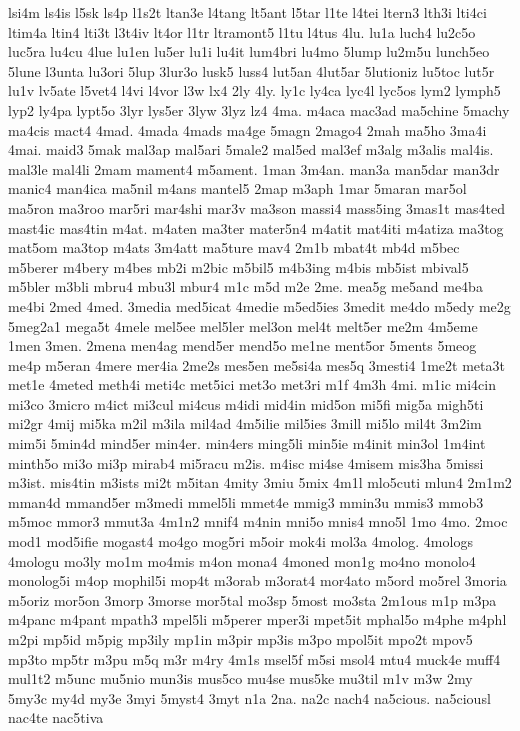 {lsi4m
ls4is
l5sk
ls4p
l1s2t
ltan3e
l4tang
lt5ant
l5tar
l1te
l4tei
ltern3
lth3i
lti4ci
ltim4a
ltin4
lti3t
l3t4iv
lt4or
l1tr
ltramont5
l1tu
l4tus
4lu.
lu1a
luch4
lu2c5o
luc5ra
lu4cu
4lue
lu1en
lu5er
lu1i
lu4it
lum4bri
lu4mo
5lump
lu2m5u
lunch5eo
5lune
l3unta
lu3ori
5lup
3lur3o
lusk5
luss4
lut5an
4lut5ar
5lutioniz
lu5toc
lut5r
lu1v
lv5ate
l5vet4
l4vi
l4vor
l3w
lx4
2ly
4ly.
ly1c
ly4ca
lyc4l
lyc5os
lym2
lymph5
lyp2
ly4pa
lypt5o
3lyr
lys5er
3lyw
3lyz
lz4
4ma.
m4aca
mac3ad
ma5chine
5machy
ma4cis
mact4
4mad.
4mada
4mads
ma4ge
5magn
2mago4
2mah
ma5ho
3ma4i
4mai.
maid3
5mak
mal3ap
mal5ari
5male2
mal5ed
mal3ef
m3alg
m3alis
mal4is.
mal3le
mal4li
2mam
mament4
m5ament.
1man
3m4an.
man3a
man5dar
man3dr
manic4
man4ica
ma5nil
m4ans
mantel5
2map
m3aph
1mar
5maran
mar5ol
ma5ron
ma3roo
mar5ri
mar4shi
mar3v
ma3son
massi4
mass5ing
3mas1t
mas4ted
mast4ic
mas4tin
m4at.
m4aten
ma3ter
mater5n4
m4atit
mat4iti
m4atiza
ma3tog
mat5om
ma3top
m4ats
3m4att
ma5ture
mav4
2m1b
mbat4t
mb4d
m5bec
m5berer
m4bery
m4bes
mb2i
m2bic
m5bil5
m4b3ing
m4bis
mb5ist
mbival5
m5bler
m3bli
mbru4
mbu3l
mbur4
m1c
m5d
m2e
2me.
mea5g
me5and
me4ba
me4bi
2med
4med.
3media
med5icat
4medie
m5ed5ies
3medit
me4do
m5edy
me2g
5meg2a1
mega5t
4mele
mel5ee
mel5ler
mel3on
mel4t
melt5er
me2m
4m5eme
1men
3men.
2mena
men4ag
mend5er
mend5o
me1ne
ment5or
5ments
5meog
me4p
m5eran
4mere
mer4ia
2me2s
mes5en
me5si4a
mes5q
3mesti4
1me2t
meta3t
met1e
4meted
meth4i
meti4c
met5ici
met3o
met3ri
m1f
4m3h
4mi.
m1ic
mi4cin
mi3co
3micro
m4ict
mi3cul
mi4cus
m4idi
mid4in
mid5on
mi5fi
mig5a
migh5ti
mi2gr
4mij
mi5ka
m2il
m3ila
mil4ad
4m5ilie
mil5ies
3mill
mi5lo
mil4t
3m2im
mim5i
5min4d
mind5er
min4er.
min4ers
ming5li
min5ie
m4init
min3ol
1m4int
minth5o
mi3o
mi3p
mirab4
mi5racu
m2is.
m4isc
mi4se
4misem
mis3ha
5missi
m3ist.
mis4tin
m3ists
mi2t
m5itan
4mity
3miu
5mix
4m1l
mlo5cuti
mlun4
2m1m2
mman4d
mmand5er
m3medi
mmel5li
mmet4e
mmig3
mmin3u
mmis3
mmob3
m5moc
mmor3
mmut3a
4m1n2
mnif4
m4nin
mni5o
mnis4
mno5l
1mo
4mo.
2moc
mod1
mod5ifie
mogast4
mo4go
mog5ri
m5oir
mok4i
mol3a
4molog.
4mologs
4mologu
mo3ly
mo1m
mo4mis
m4on
mona4
4moned
mon1g
mo4no
monolo4
monolog5i
m4op
mophil5i
mop4t
m3orab
m3orat4
mor4ato
m5ord
mo5rel
3moria
m5oriz
mor5on
3morp
3morse
mor5tal
mo3sp
5most
mo3sta
2m1ous
m1p
m3pa
m4panc
m4pant
mpath3
mpel5li
m5perer
mper3i
mpet5it
mphal5o
m4phe
m4phl
m2pi
mp5id
m5pig
mp3ily
mp1in
m3pir
mp3is
m3po
mpol5it
mpo2t
mpov5
mp3to
mp5tr
m3pu
m5q
m3r
m4ry
4m1s
msel5f
m5si
msol4
mtu4
muck4e
muff4
mul1t2
m5unc
mu5nio
mun3is
mus5co
mu4se
mus5ke
mu3til
m1v
m3w
2my
5my3c
my4d
my3e
3myi
5myst4
3myt
n1a
2na.
na2c
nach4
na5cious.
na5ciousl
nac4te
nac5tiva
}
